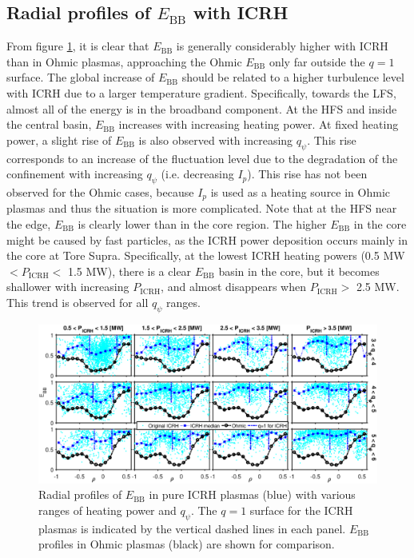 \subsection{Radial profiles of $E_\mathrm{BB}$ with ICRH} \label{sec:EBB_ICRH}

From figure \ref{fig:EBB_ICRH}, it is clear that $E_\mathrm{BB}$ is generally considerably higher with ICRH than in Ohmic plasmas, approaching the Ohmic $E_\mathrm{BB}$ only far outside the $q = 1$ surface. The global increase of $E_\mathrm{BB}$ should be related to a higher turbulence level with ICRH due to a larger temperature gradient. Specifically, towards the LFS, almost all of the energy is in the broadband component. At the HFS and inside the central basin, $E_\mathrm{BB}$ increases with increasing heating power. At fixed heating power, a slight rise of $E_\mathrm{BB}$ is also observed with increasing $q_{\psi}$. This rise corresponds to an increase of the fluctuation level due to the degradation of the confinement with increasing $q_{\psi}$ (i.e. decreasing $I_p$). This rise has not been observed for the Ohmic cases, because $I_p$ is used as a heating source in Ohmic plasmas and thus the situation is more complicated. Note that at the HFS near the edge, $E_\mathrm{BB}$ is clearly lower than in the core region. The higher $E_\mathrm{BB}$ in the core might be caused by fast particles, as the ICRH power deposition occurs mainly in the core at Tore Supra. Specifically, at the lowest ICRH heating powers (0.5 MW $< P_\mathrm{ICRH} <$ 1.5 MW), there is a clear $E_\mathrm{BB}$ basin in the core, but it becomes shallower with increasing $P_\mathrm{ICRH}$, and almost disappears when $P_\mathrm{ICRH} > $ 2.5 MW. This trend is observed for all $q_{\psi}$ ranges.


\begin{figure}[h]
\begin{centering}
\includegraphics[scale=0.535]{fig_EBB_ICRH.eps}
\par\end{centering}
\caption{Radial profiles of $E_\mathrm{BB}$ in pure ICRH plasmas (blue) with various ranges of heating power and $q_{\psi}$. The $q = 1$ surface for the ICRH plasmas is indicated by the vertical dashed lines in each panel. $E_\mathrm{BB}$ profiles in Ohmic plasmas (black) are shown for comparison.}
\label{fig:EBB_ICRH}
\end{figure}


